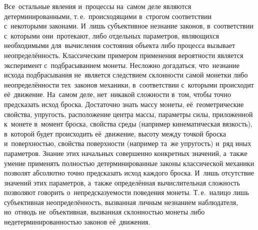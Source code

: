 \documentclass[]{scrartcl}
\begin{document}
Все~остальные явления и~процессы на~самом деле являются детерминированными, т.\,е.~происходящими в~строгом соответствии с~некоторыми законами. И~лишь субъективное незнание законов, в~соответствии с~которыми они~протекают, либо отдельных параметров, являющихся необходимыми для~вычисления состояния объекта либо процесса вызывает неопределённость. Классическим примером применения вероятности является эксперимент с~подбрасыванием монеты. Несложно догадаться, что~незнание исхода подбрасывания не~является следствием склонности самой монетки либо неопределённости тех~законов механики, в~соответствии с~которыми происходит её~движение. На~самом деле, нет~никакой сложности в~том, чтобы точно предсказать исход броска. Достаточно знать массу монеты, её~геометрические свойства, упругость, расположение центра массы, параметры силы, приложенной к~монете в~момент броска, свойства среды (например кинематическая вязкость), в~которой будет происходить её~движение, высоту между точкой броска и~поверхностью, свойства поверхности (например та~же упругость) и~ряд иных параметров. Знание этих начальных совершенно конкретных значений, а~также умение применять полностью детерминированные законы классической механики позволят абсолютно точно предсказать исход каждого броска. И~лишь отсутствие значений этих параметров, а~также определённая вычислительная сложность позволяют говорить о~непредсказуемости поведения монеты. Т.\,е.~налицо лишь субъективная неопределённость, вызванная личным незнанием наблюдателя, но~отнюдь не~объективная, вызванная склонностью монеты либо недетерминированностью законов её~движения.
\end{document}
